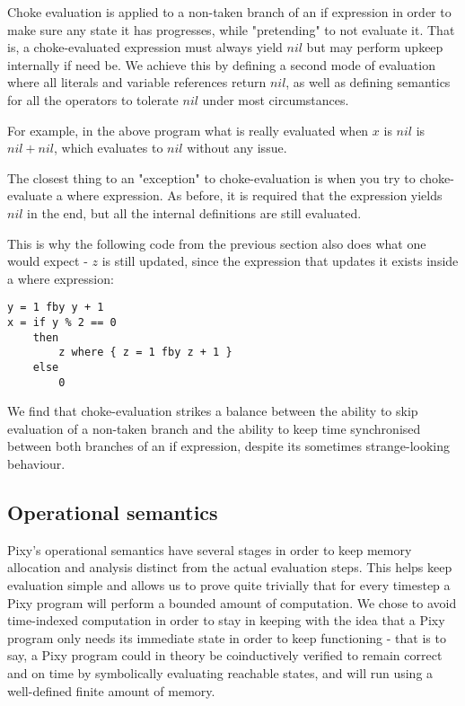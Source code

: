\documentclass{scrartcl}
\begin{document}
    Choke evaluation is applied to a non-taken branch of an if expression in order to make sure any state it has progresses, while "pretending" to not evaluate it. That is, a choke-evaluated expression must always yield $nil$ but may perform upkeep internally if need be. We achieve this by defining a second mode of evaluation where all literals and variable references return $nil$, as well as defining semantics for all the operators to tolerate $nil$ under most circumstances.
    
    For example, in the above program what is really evaluated when $x$ is $nil$ is $nil + nil$, which evaluates to $nil$ without any issue.
    
    The closest thing to an "exception" to choke-evaluation is when you try to choke-evaluate a where expression. As before, it is required that the expression yields $nil$ in the end, but all the internal definitions are still evaluated.
    
    This is why the following code from the previous section also does what one would expect - $z$ is still updated, since the expression that updates it exists inside a where expression:
    
    \begin{lstlisting}
y = 1 fby y + 1
x = if y % 2 == 0
    then
        z where { z = 1 fby z + 1 }
    else
        0
    \end{lstlisting}
    
    We find that choke-evaluation strikes a balance between the ability to skip evaluation of a non-taken branch and the ability to keep time synchronised between both branches of an if expression, despite its sometimes strange-looking behaviour.
    
    \subsection{Operational semantics}
    
    Pixy's operational semantics have several stages in order to keep memory allocation and analysis distinct from the actual evaluation steps. This helps keep evaluation simple and allows us to prove quite trivially that for every timestep a Pixy program will perform a bounded amount of computation. We chose to avoid time-indexed computation in order to stay in keeping with the idea that a Pixy program only needs its immediate state in order to keep functioning - that is to say, a Pixy program could in theory be coinductively verified to remain correct and on time by symbolically evaluating reachable states, and will run using a well-defined finite amount of memory.
    
\end{document}
